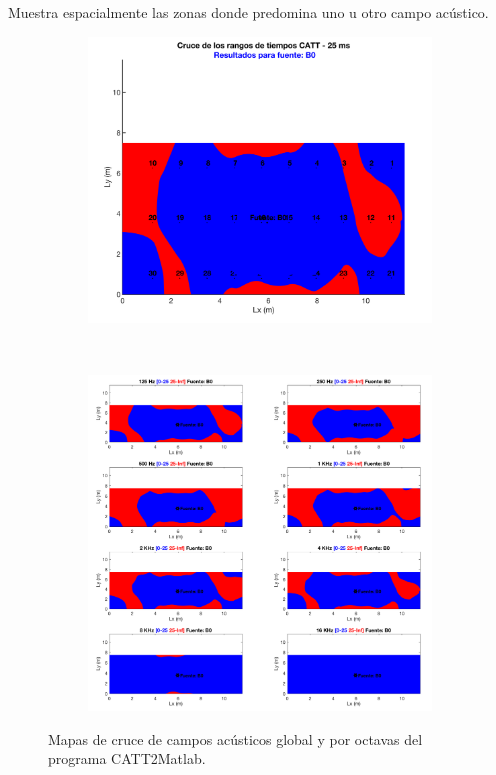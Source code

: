 \begin{description}
	Muestra espacialmente las zonas donde predomina uno u otro campo acústico.
	\begin{figure}[ht]
    \centering
    \begin{subfigure}[b]{0.3\textwidth}
    	\centering
        \includegraphics[width=0.9\linewidth]{archivos/capturas/cruce1}
    \end{subfigure}
    ~ %
    \begin{subfigure}[b]{0.3\textwidth}
    	\centering
        \includegraphics[width=0.9\linewidth]{archivos/capturas/cruce2}
    \end{subfigure}
    \caption{Mapas de cruce de campos acústicos global y por octavas del programa CATT2Matlab.}
\end{figure}
\FloatBarrier 
	

\end{description}
